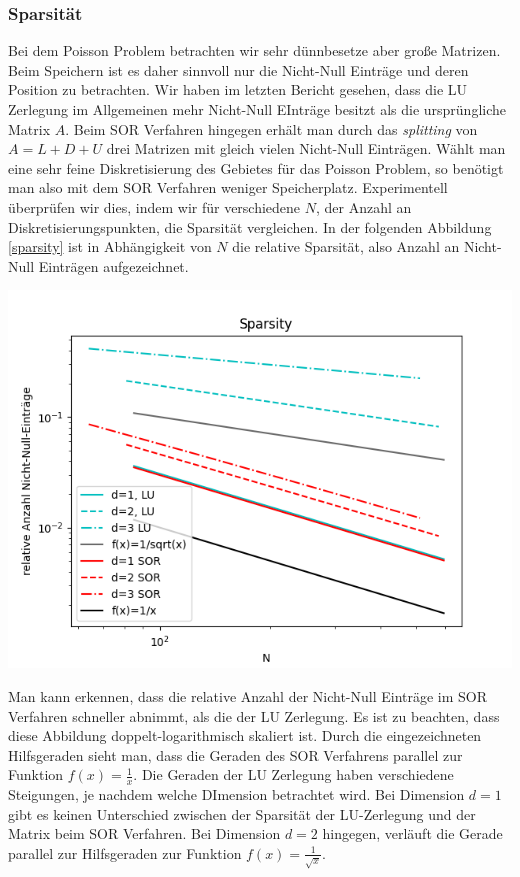 \documentclass[smallheadings]{scrartcl}
\theoremstyle{definition}
\begin{document}
 

\subsubsection{Sparsität}
Bei dem Poisson Problem betrachten wir sehr dünnbesetze aber große Matrizen.  Beim Speichern ist es daher sinnvoll nur die Nicht-Null Einträge und deren Position zu betrachten.  Wir haben im letzten Bericht gesehen,  dass die LU Zerlegung im Allgemeinen mehr Nicht-Null EInträge besitzt als die ursprüngliche Matrix $A$.  Beim SOR Verfahren hingegen erhält man durch das \textit{splitting} von $A=L+D+U$ drei Matrizen mit gleich vielen Nicht-Null Einträgen.  Wählt man eine sehr feine Diskretisierung des Gebietes für das Poisson Problem,  so benötigt man also mit dem SOR Verfahren weniger Speicherplatz.   Experimentell überprüfen wir dies, indem wir für verschiedene $N$, der Anzahl an Diskretisierungspunkten, die Sparsität vergleichen. 
In der folgenden Abbildung \ref{sparsity} ist in Abhängigkeit von $N$ die relative Sparsität, also Anzahl an Nicht-Null Einträgen aufgezeichnet. 

\begin{minipage}{\textwidth}

 \centering
 \includegraphics[scale = 0.9]{Sparsity1}
 	\label{sparsity}

 \end{minipage}

Man kann erkennen, dass die relative Anzahl der Nicht-Null Einträge im SOR Verfahren schneller abnimmt, als die der LU Zerlegung.  Es ist zu beachten, dass diese Abbildung doppelt-logarithmisch  skaliert ist.  Durch die eingezeichneten Hilfsgeraden sieht man, dass die Geraden des SOR Verfahrens parallel zur Funktion $f(x)=\frac{1}{x}$. Die Geraden der LU Zerlegung haben verschiedene Steigungen,  je nachdem welche DImension betrachtet wird. Bei Dimension $d=1$ gibt es keinen Unterschied zwischen der Sparsität der LU-Zerlegung und der Matrix beim SOR Verfahren.  Bei Dimension $d=2$ hingegen, verläuft die Gerade parallel zur Hilfsgeraden zur Funktion $f(x)=\frac{1}{\sqrt{x}}$. 
\end{document}
